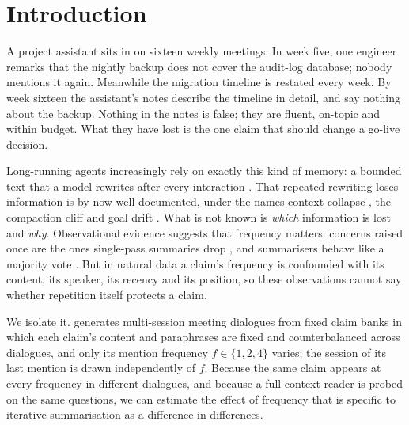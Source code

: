 \section{Introduction}
\label{sec:intro}

A project assistant sits in on sixteen weekly meetings.
In week five, one engineer remarks that the nightly backup does not cover the audit-log database; nobody mentions it again.
Meanwhile the migration timeline is restated every week.
By week sixteen the assistant's notes describe the timeline in detail, and say nothing about the backup.
Nothing in the notes is false; they are fluent, on-topic and within budget.
What they have lost is the one claim that should change a go-live decision.

Long-running agents increasingly rely on exactly this kind of memory: a bounded text that a model rewrites after every interaction \citep{wang2023recursively,packer2023memgpt,chhikara2025mem0,xu2025amem}.
That repeated rewriting loses information is by now well documented, under the names context collapse \citep{zhang2026ace}, the compaction cliff \citep{zerhoudi2026compaction} and goal drift \citep{zahn2026facts}.
What is not known is \emph{which} information is lost and \emph{why}.
Observational evidence suggests that frequency matters: concerns raised once are the ones single-pass summaries drop \citep{tamme2027voice}, and summarisers behave like a majority vote \citep{tian2026rgmem}.
But in natural data a claim's frequency is confounded with its content, its speaker, its recency and its position, so these observations cannot say whether repetition itself protects a claim.

We isolate it.
\sys{} generates multi-session meeting dialogues from fixed claim banks in which each claim's content and paraphrases are fixed and counterbalanced across dialogues, and only its mention frequency $f\in\{1,2,4\}$ varies; the session of its last mention is drawn independently of $f$.
Because the same claim appears at every frequency in different dialogues, and because a full-context reader is probed on the same questions, we can estimate the effect of frequency that is specific to iterative summarisation as a difference-in-differences.

